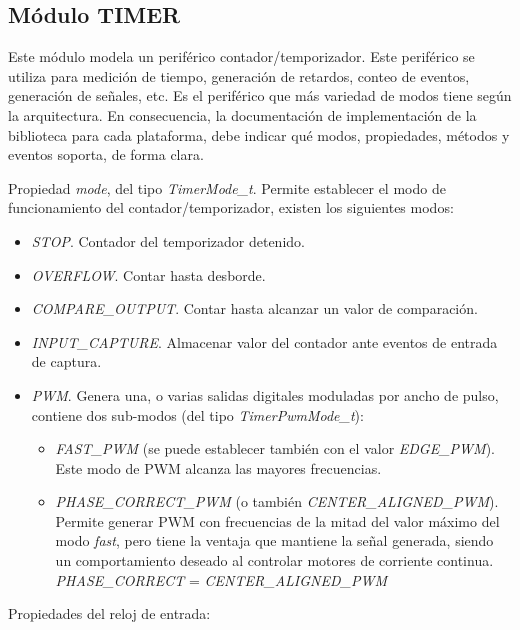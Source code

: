 \subsection{Módulo TIMER}

Este módulo modela un periférico contador/temporizador. Este periférico se utiliza para medición de tiempo, generación de retardos, conteo de eventos, generación de señales, etc. Es el periférico que más variedad de modos tiene según la arquitectura. En consecuencia, la documentación de implementación de la biblioteca para cada plataforma, debe indicar qué modos, propiedades, métodos y eventos soporta, de forma clara.


Propiedad \emph{mode}, del tipo \emph{TimerMode\_t}. Permite establecer el modo de funcionamiento del contador/temporizador, existen los siguientes modos:

\begin{itemize}
\item
\emph{STOP}. Contador del temporizador detenido.
\item
\emph{OVERFLOW}. Contar hasta desborde.
\item
\emph{COMPARE\_OUTPUT}. Contar hasta alcanzar un valor de comparación.
\item
\emph{INPUT\_CAPTURE}. Almacenar valor del contador ante eventos de entrada de captura.
\item
\emph{PWM}. Genera una, o varias salidas digitales moduladas por ancho de pulso, contiene dos sub-modos (del tipo \emph{TimerPwmMode\_t}):
\begin{itemize}
\item
\emph{FAST\_PWM} (se puede establecer también con el valor \emph{EDGE\_PWM}). Este modo de PWM alcanza las mayores frecuencias. 
\item
\emph{PHASE\_CORRECT\_PWM} (o también \emph{CENTER\_ALIGNED\_PWM}). Permite generar PWM con frecuencias de la mitad del valor máximo del modo \emph{fast}, pero tiene la ventaja que  mantiene la señal generada, siendo un comportamiento deseado al controlar motores de corriente continua.
\emph{PHASE\_CORRECT} = \emph{CENTER\_ALIGNED\_PWM}
\end{itemize}
\end{itemize}

Propiedades del reloj de entrada:

